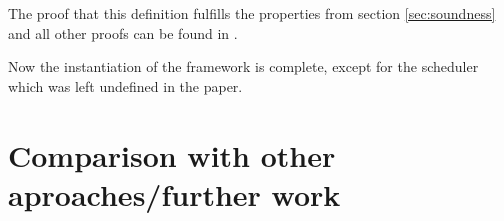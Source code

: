 \documentclass[a4paper,10pt]{llncs}
\begin{document}
The proof that this definition fulfills the properties from section \ref{sec:soundness} and all other
proofs can be found in \cite{Barthe09}.

Now the instantiation of the framework is complete, except for the scheduler which was left undefined
in the paper.

\section{Comparison with other aproaches/further work}
\label{sec:furtherwork}


\end{document}
